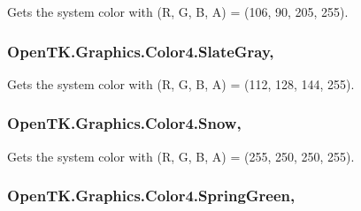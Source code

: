 Gets the system color with (R, G, B, A) = (106, 90, 205, 255). 

\hypertarget{struct_open_t_k_1_1_graphics_1_1_color4_ad1e3354b2aed0e0a3f44b18f1d60166e}{
\subsubsection[{Slate\-Gray}]{ Open\-T\-K.\-Graphics.\-Color4.\-Slate\-Gray\hspace{0.3cm}{\ttfamily [static]}, {\ttfamily [get]}}}\label{struct_open_t_k_1_1_graphics_1_1_color4_ad1e3354b2aed0e0a3f44b18f1d60166e}


Gets the system color with (R, G, B, A) = (112, 128, 144, 255). 

\hypertarget{struct_open_t_k_1_1_graphics_1_1_color4_a17de74a9267edab7002c95990e572d38}{
\subsubsection[{Snow}]{ Open\-T\-K.\-Graphics.\-Color4.\-Snow\hspace{0.3cm}{\ttfamily [static]}, {\ttfamily [get]}}}\label{struct_open_t_k_1_1_graphics_1_1_color4_a17de74a9267edab7002c95990e572d38}


Gets the system color with (R, G, B, A) = (255, 250, 250, 255). 

\hypertarget{struct_open_t_k_1_1_graphics_1_1_color4_a7b799bd01f53756825dde720d0169bdf}{
\subsubsection[{Spring\-Green}]{ Open\-T\-K.\-Graphics.\-Color4.\-Spring\-Green\hspace{0.3cm}{\ttfamily [static]}, {\ttfamily [get]}}}\label{struct_open_t_k_1_1_graphics_1_1_color4_a7b799bd01f53756825dde720d0169bdf}


